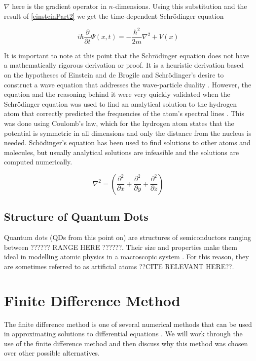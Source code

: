 \documentclass[authoryearcitations]{UoYCSproject}
\begin{document}
$\nabla$ here is the gradient operator in $n$-dimensions. Using this substitution and the result of 
\ref{einsteinPart2} we get the time-dependent Schr\"{o}dinger equation 


\begin{equation}
i\hbar\frac{\partial}{\partial t}\Psi (x,t) = -\frac{\hbar ^2}{2m}\nabla ^2 + V(x)
\label{eq:H}
\end{equation}

It is important to note at this point that the Schr\"{o}dinger equation does not have a mathematically rigorous 
derivation or proof. It is a heuristic derivation based on the hypotheses of Einstein and de Brogile and Schr\"{o}dinger's
desire to construct a wave equation that addresses the wave-particle duality \cite{ricardo, qp}. %
However, the equation and the reasoning behind it were very quickly validated when the Schr\"{o}dinger equation was used
to find an analytical solution to the hydrogen atom that correctly predicted the frequencies of the atom's spectral lines
\cite{qp}. This was done using Coulomb's law, which for the hydrogen atom states that the potential is symmetric in all dimensions
and only the distance from the nucleus is needed. Sch\"{o}dinger's equation has been used to find solutions to other atoms and
molecules, but usually analytical solutions are infeasible and the solutions are computed numerically. 

\begin{equation}
\nabla ^2 = \left(\frac{\partial ^2}{\partial x} + \frac{\partial ^2}{\partial y} + \frac{\partial ^2}{\partial z}\right) 
\label{eq:laplace}
\end{equation}


\subsection{Structure of Quantum Dots}
Quantum dots (QDs from this point on) are structures of semiconductors ranging between ??????
RANGE HERE ??????. Their size and properties make them ideal in modelling atomic physics in a
macroscopic system \cite{Li}. For this reason, they are sometimes referred to as artificial atoms 
??CITE RELEVANT HERE??.



\section{Finite Difference Method}
The finite difference method is one of several numerical methods that can be used in approximating
solutions to differential equations \cite{Hamming}. We will work through the use of the finite 
difference method and then discuss why this method was chosen over other possible alternatives. 
\end{document}
